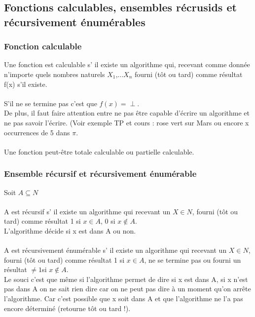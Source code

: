 \documentclass[11pt,a4paper]{article}
\begin{document}

\subsection{Fonctions calculables, ensembles récrusids et récursivement énumérables}
\label{sub:fonctions_calculables_ensembles_r_crusids_et_r_cursivement_num_rables}

\subsubsection{Fonction calculable}
\label{ssub:fonction_calculable}
Une fonction est calculable s’ il existe un algorithme qui, recevant comme donnée
n'importe quels nombres naturels $X_1$,...$X_n$ fourni (tôt ou tard) comme 
résultat f(x) s’il existe.
\paragraph{} S’il ne se termine pas c'est que $f(x)=\perp$. \\
De plus, il faut faire attention entre ne pas être capable d'écrire un algorithme
et ne pas savoir l'écrire. (Voir exemple TP et cours : rose vert sur Mars ou encore
x occurrences de 5 dans $\pi$.
\paragraph{} Une fonction peut-être totale calculable ou partielle calculable.


\subsubsection{Ensemble récursif et récursivement énumérable}
\label{ssub:ensemble_r_cursif_et_r_cursivement_num_rable}
Soit $A\subseteq N$\\
\paragraph{}A est récursif s’ il existe un algorithme qui recevant un $X\in N$, fourni (tôt ou 
tard) comme résultat 1 si $x\in A$, 0 si $x\notin A$.\\
L'algorithme décide si x est dans A ou non.

\paragraph{}A est récursivement énumérable s’ il existe un algorithme qui recevant
un $X\in N$, fourni (tôt ou tard) comme résultat 1 si $x\in A$, ne se termine pas
ou fourni un résultat $\neq1$si $x\notin A$.\\
Le souci c'est que même si l'algorithme permet de dire si x est dans A, si x
n'est pas dans A on ne sait rien dire car on ne peut pas dire à un moment qu'on
arrête l'algorithme. Car c'est possible que x soit dans A et que l'algorithme ne
l'a pas encore déterminé (retourne tôt ou tard !).
\end{document}
